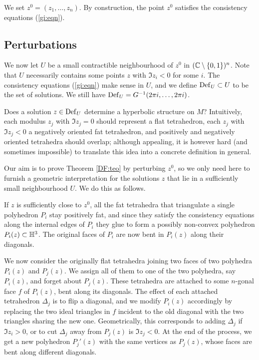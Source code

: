 We set $z^0 = (z_1,\ldots, z_n)$. By construction, the point $z^0$ satisfies the consistency equations (\ref{gi:eqn}). 

\subsection{Perturbations}
We now let $U$ be a small contractible neighbourhood of $z^0$ in $(\mathbb{C} \setminus \{0,1\})^n$. Note that $U$ necessarily contains some points $z$ with $\Im z_i <0$ for some $i$. The consistency equations (\ref{gi:eqn}) make sense in $U$, and we define ${\rm Def}_U \subset U$ to be the set of solutions. We still have ${\rm Def}_U = G^{-1}(2\pi i, \ldots, 2\pi i)$.

Does a solution $z\in {\rm Def}_U$ determine a hyperbolic structure on $M$? Intuitively, each modulus $z_j$ with $\Im z_j=0$ should represent a flat tetrahedron, each $z_j$ with $\Im z_j <0$ a negatively oriented fat tetrahedron, and positively and negatively oriented tetrahedra should overlap; although appealing, it is however hard (and sometimes impossible) to translate this idea into a concrete definition in general.

Our aim is to prove Theorem \ref{DF:teo} by perturbing $z^0$, so we only need here to furnish a geometric interpretation for the solutions $z$ that lie in a sufficiently small neighbourhood $U$. We do this as follows. 

If $z$ is sufficiently close to $z^0$, all the fat tetrahedra that triangulate a single polyhedron $P_i$ stay positively fat, and since they satisfy the consistency equations along the internal edges of $P_i$ they glue to form a possibly non-convex polyhedron $P_i(z)\subset \mathbb{H}^3$. The original faces of $P_i$ are now bent in $P_i(z)$ along their diagonals.

We now consider the originally flat tetrahedra joining two faces of two polyhedra $P_i(z)$ and $P_j(z)$. We assign all of them to one of the two polyhedra, say $P_i(z)$, and forget about $P_j(z)$. These tetrahedra are attached to some $n$-gonal face $f$ of $P_i(z)$, bent along its diagonals. The effect of each attached tetrahedron $\Delta_j$ is to flip a diagonal, and we modify $P_i(z)$ accordingly by replacing the two ideal triangles in $f$ incident to the old diagonal with the two triangles sharing the new one. Geometrically, this corresponds to adding $\Delta_j$ if $\Im z_i >0$, or to cut $\Delta_j$ away from $P_j(z)$ is $\Im z_j <0$. At the end of the process, we get a new polyhedron $P_j'(z)$ with the same vertices as $P_j(z)$, whose faces are bent along different diagonals.

